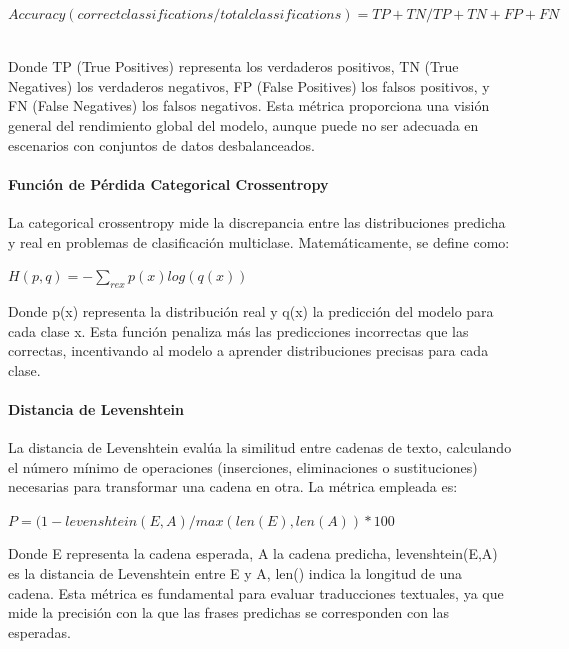 \documentclass[10pt]{article}
\begin{document}
\vspace{1\baselineskip}
\( Accuracy(correct classifications / total classifications) =  TP+TN / TP+TN+FP+FN\)\ \ \ \ \ \ \ 

\vspace{1\baselineskip}
\begin{flushleft}
Donde TP (True Positives) representa los verdaderos positivos, TN (True Negatives) los verdaderos negativos, FP (False Positives) los falsos positivos, y FN (False Negatives) los falsos negativos. Esta métrica proporciona una visión general del rendimiento global del modelo, aunque puede no ser adecuada en escenarios con conjuntos de datos desbalanceados.
\end{flushleft}


\paragraph{Función de Pérdida Categorical Crossentropy}

La categorical crossentropy mide la discrepancia entre las distribuciones predicha y real en problemas de clasificación multiclase. Matemáticamente, se define como:

\vspace{1\baselineskip}
\( H(p, q)  =  -\sum_{rex}^{}p(x)log(q(x))\)\ \ \ \ \ \ 

\vspace{1\baselineskip}
\begin{flushleft}
Donde p(x) representa la distribución real y q(x) la predicción del modelo para cada clase x. Esta función penaliza más las predicciones incorrectas que las correctas, incentivando al modelo a aprender distribuciones precisas para cada clase. \ \ \ \ \ \ \ 
\end{flushleft}


\paragraph{Distancia de Levenshtein}

La distancia de Levenshtein evalúa la similitud entre cadenas de texto, calculando el número mínimo de operaciones (inserciones, eliminaciones o sustituciones) necesarias para transformar una cadena en otra. La métrica empleada es:

\vspace{1\baselineskip}
\( P  =  (1 -levenshtein(E, A) / max(len(E), len(A)) \ast  100\)

\vspace{1\baselineskip}
\begin{flushleft}
Donde E representa la cadena esperada, A la cadena predicha, levenshtein(E,A) es la distancia de Levenshtein entre E y A, len() indica la longitud de una cadena. Esta métrica es fundamental para evaluar traducciones textuales, ya que mide la precisión con la que las frases predichas se corresponden con las esperadas.
\end{flushleft}
\end{document}
